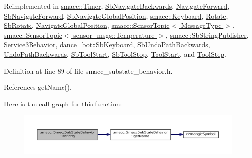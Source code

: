 Reimplemented in \hyperlink{classsmacc_1_1Timer_ab99111438ad35cf740ed4bd8c136ff6a}{smacc\+::\+Timer}, \hyperlink{classSbNavigateBackwards_a59b7bc4f0b714f548c73659c87dd405e}{Sb\+Navigate\+Backwards}, \hyperlink{classNavigateForward_a2a1ad66b031773aeac11663020afebba}{Navigate\+Forward}, \hyperlink{classSbNavigateForward_a0e01d850ed0e028f3b9b3704862c7ea5}{Sb\+Navigate\+Forward}, \hyperlink{classSbNavigateGlobalPosition_ae4c1f2e5de1077ee88d506eb69099f0c}{Sb\+Navigate\+Global\+Position}, \hyperlink{classsmacc_1_1Keyboard_afd90aca9ae741a0648e273b70771ac1d}{smacc\+::\+Keyboard}, \hyperlink{classRotate_ab07f79966ab172e454139c4139adf51b}{Rotate}, \hyperlink{classSbRotate_adb33f70659313834da495c294e2eafeb}{Sb\+Rotate}, \hyperlink{classNavigateGlobalPosition_a80962ce5bba51285565e360872f58c47}{Navigate\+Global\+Position}, \hyperlink{classsmacc_1_1SensorTopic_a27fe3515e3981a5a393dea193902cbd0}{smacc\+::\+Sensor\+Topic$<$ Message\+Type $>$}, \hyperlink{classsmacc_1_1SensorTopic_a27fe3515e3981a5a393dea193902cbd0}{smacc\+::\+Sensor\+Topic$<$ sensor\+\_\+msgs\+::\+Temperature $>$}, \hyperlink{classsmacc_1_1SbStringPublisher_adde036f7d11370ec44ed418c2734b60a}{smacc\+::\+Sb\+String\+Publisher}, \hyperlink{classService3Behavior_a914618fa7f8152868204543838cd8359}{Service3\+Behavior}, \hyperlink{classdance__bot_1_1SbKeyboard_a26f2b4191ab58f32be4d41ffb74b6005}{dance\+\_\+bot\+::\+Sb\+Keyboard}, \hyperlink{classSbUndoPathBackwards_ab7eed4fa4633235b877758bd787bbea1}{Sb\+Undo\+Path\+Backwards}, \hyperlink{classUndoPathBackwards_a073a69a9e7b89d38faaab47096df292c}{Undo\+Path\+Backwards}, \hyperlink{classSbToolStart_a1f027da301c03b5114fc241c820dd56a}{Sb\+Tool\+Start}, \hyperlink{classSbToolStop_a411f6a864d2d70be43bdedc0c7ce77ac}{Sb\+Tool\+Stop}, \hyperlink{classToolStart_a23b54807a3d839a08a6031e67b341a4f}{Tool\+Start}, and \hyperlink{classToolStop_a1db01a6b333c6570cbad3495a483d452}{Tool\+Stop}.



Definition at line 89 of file smacc\+\_\+substate\+\_\+behavior.\+h.



References get\+Name().




Here is the call graph for this function\+:
\nopagebreak
\begin{figure}[H]
\begin{center}
\leavevmode
\includegraphics[width=350pt]{classsmacc_1_1SmaccSubStateBehavior_a7c28e1c46238bbb2c2e0450573c6de94_cgraph}
\end{center}
\end{figure}


